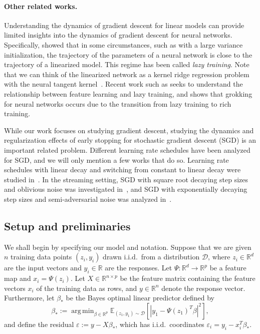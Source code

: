 \documentclass[11pt]{article}
\DeclareMathOperator*{\argmin}{arg\,min}
\begin{document}
\paragraph{Other related works.}
Understanding the dynamics of gradient descent for linear models can provide limited insights into the dynamics of gradient descent for neural networks. Specifically, \cite{chizat2019lazytraining} showed that in some circumstances, such as with a large variance initialization, the trajectory of the parameters of a neural network is close to the trajectory of a linearized model. This regime has been called \emph{lazy training}. Note that we can think of the linearized network as a kernel ridge regression problem with the neural tangent kernel~\cite{jacot2018ntk}. Recent work such as \cite{geiger2020disentangling} seeks to understand the relationship between feature learning and lazy training, and \cite{kumar2024grokking} shows that grokking for neural networks occurs due to the transition from lazy training to rich training. 

While our work focuses on studying gradient descent, studying the dynamics and regularization effects of early stopping for stochastic gradient descent (SGD) is an important related problem.
Different learning rate schedules have been analyzed for SGD, and we will only mention a few works that do so.
Learning rate schedules with linear decay and switching from constant to linear decay were studied in~\cite{gower2019sgd}. In the streaming setting, SGD with square root decaying step sizes and oblivious noise was investigated in~\cite{pesme2020online}, and SGD with exponentially decaying step sizes and semi-adversarial noise was analyzed in~\cite{jeong2025stochastic}.

\subsection{Setup and preliminaries}
We shall begin by specifying our model and notation.
Suppose that we are given $n$ training data points $(z_i, y_i)$ drawn i.i.d.\ from a distribution $\mathcal{D}$, where $z_i \in \mathbb{R}^d$ are the input vectors and $y_i \in \mathbb{R}$ are the responses. Let $\Psi: \mathbb{R}^d \to \mathbb{R}^p$ be a feature map and $x_i = \Psi(z_i)$.
Let $X \in \mathbb{R}^{n \times p}$ be the feature matrix containing the feature vectors $x_i$ of the training data as rows, and $y \in \mathbb{R}^{n}$ denote the response vector.
Furthermore, let $\beta_*$ be the Bayes optimal linear predictor defined by
\begin{equation}
    \beta_* := \argmin_{\beta \in \mathbb{R}^p} \mathbb{E}_{(z_1, y_1) \sim \mathcal{D}} \left[|y_1 - \Psi(z_1)^T\beta|^2\right],
\end{equation}
and define the residual $\varepsilon := y - X\beta_*$, which has i.i.d.\ coordinates $\varepsilon_i = y_i - x_i^T \beta_*$.
\end{document}
